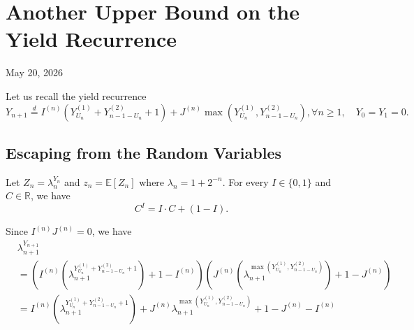 \chapter{Another Upper Bound on the Yield Recurrence}

\begin{center}
  May 20, 2026
  \vspace{0.5cm}
\end{center}

Let us recall the yield recurrence
$$Y_{n+1} \stackrel{d}{=} I^{(n)}\left(Y_{U_n}^{(1)} + Y_{n-1-U_n}^{(2)} + 1\right) + J^{(n)}\max\left(Y_{U_n}^{(1)}, Y_{n-1-U_n}^{(2)}\right),\forall n \geq 1, \quad Y_0 = Y_1 = 0.$$

\section{Escaping from the Random Variables}

Let $Z_n = \lambda_n^{Y_n}$ and $z_n = \mathbb{E}[Z_n]$ where $\lambda_n = 1 + 2^{-n}$. For every $I\in \{0,1\}$ and $C\in \mathbb{R}$, we have
$$C^I = I\cdot C + (1-I).$$

Since $I^{(n)}J^{(n)}=0$, we have
\begin{align*}
   & \lambda_{n+1}^{Y_{n+1}}                                                                                                                                                                                 \\
   & = \left(I^{(n)}\left(\lambda_{n+1}^{Y_{U_n}^{(1)} + Y_{n-1-U_n}^{(2)} + 1}\right) + 1-I^{(n)}\right)\left(J^{(n)}\left(\lambda_{n+1}^{\max(Y_{U_n}^{(1)}, Y_{n-1-U_n}^{(2)})}\right) + 1-J^{(n)}\right) \\
   & = I^{(n)}\left(\lambda_{n+1}^{Y_{U_n}^{(1)} + Y_{n-1-U_n}^{(2)} + 1}\right) + J^{(n)}\lambda_{n+1}^{\max\left(Y_{U_n}^{(1)}, Y_{n-1-U_n}^{(2)}\right)} + 1 - J^{(n)} - I^{(n)}
\end{align*}

